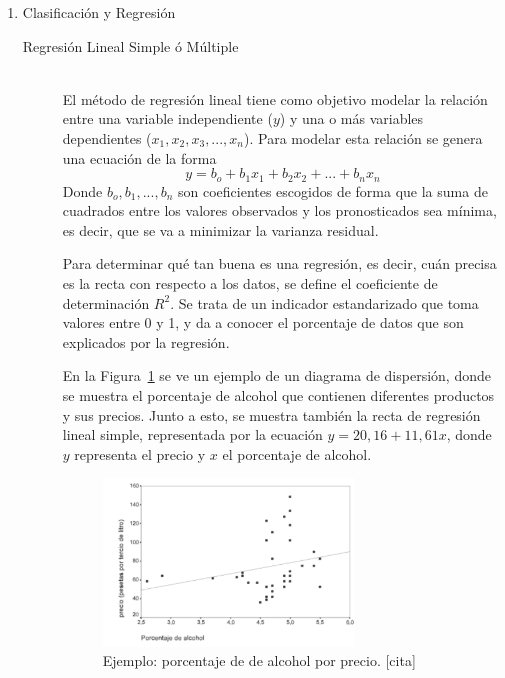 \begin{enumerate}
  \item Clasificación y Regresión
    \begin{description}
      \item[Regresión Lineal Simple ó Múltiple] \hfill \\
      El método de regresión lineal tiene como objetivo modelar la relación entre una variable independiente ($y$) y una o más variables dependientes ($x_1, x_2, x_3,...,x_n$). Para modelar esta relación se genera una ecuación de la forma 
      \begin{equation}\label{rlineal}
      y= b_o + b_1 x_1 + b_2 x_2 + ... + b_n x_n 
      \end{equation}
      Donde $b_o,b_1,...,b_n$ son coeficientes escogidos de forma que la suma de cuadrados entre los valores observados y los pronosticados sea mínima, es decir, que se va a minimizar la varianza residual.
      
      Para determinar qué tan buena es una regresión, es decir, cuán precisa es la recta con respecto a los datos, se define el coeficiente de determinación $R^2$. Se trata de un indicador estandarizado que toma valores entre 0 y 1, y da a conocer el porcentaje de datos que son explicados por la regresión. 
      
      En la Figura~\ref{fig:dispersion} se ve un ejemplo de un diagrama de dispersión, donde se muestra el porcentaje de alcohol que contienen diferentes productos y sus precios. Junto a esto, se muestra también la recta de regresión lineal simple, representada por la ecuación $y=20,16+11,61x$, donde $y$ representa el precio y $x$ el porcentaje de alcohol. 
      
    \begin{figure}[H]
        \centering
        \includegraphics[width=0.7\textwidth]{Figuras/Dispersion}
         \caption{Ejemplo: porcentaje de de alcohol por precio. [cita]}
         \label{fig:dispersion}
    \end{figure}
      

\end{description}
\end{enumerate}
